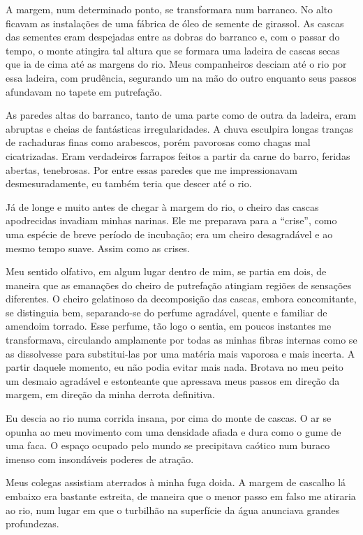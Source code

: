 A margem, num determinado ponto, se transformara num barranco. No alto ficavam as instalações de uma fábrica de óleo de semente de girassol. As cascas das sementes eram despejadas entre as dobras do barranco e, com o passar do tempo, o monte atingira tal altura que se formara uma ladeira de cascas secas que ia de cima até as margens do rio.
Meus companheiros desciam até o rio por essa ladeira, com prudência, segurando um na mão do outro enquanto seus passos afundavam no tapete em putrefação.

As paredes altas do barranco, tanto de uma parte como de outra da ladeira, eram abruptas e cheias de fantásticas irregularidades. A chuva esculpira longas tranças de rachaduras finas como arabescos, porém pavorosas como chagas mal cicatrizadas. Eram verdadeiros farrapos feitos a partir da carne do barro, feridas abertas, tenebrosas.
Por entre essas paredes que me impressionavam desmesuradamente, eu também teria que descer até o rio.

Já de longe e muito antes de chegar à margem do rio, o cheiro das cascas apodrecidas invadiam minhas narinas. Ele me preparava para a ``crise'', como uma espécie de breve período de incubação; era um cheiro desagradável e ao mesmo tempo suave. Assim como as crises.

Meu sentido olfativo, em algum lugar dentro de mim, se partia em dois, de maneira que as emanações do cheiro de putrefação atingiam regiões de sensações diferentes. O cheiro gelatinoso da decomposição das cascas, embora concomitante, se distinguia bem, separando-se do perfume agradável, quente e familiar de amendoim torrado. 
Esse perfume, tão logo o sentia, em poucos instantes me transformava, circulando amplamente por todas as minhas fibras internas como se as dissolvesse para substitui-las por uma matéria mais vaporosa e mais incerta. A partir daquele momento, eu não podia evitar mais nada. Brotava no meu peito um desmaio agradável e estonteante que apressava meus passos em direção da margem, em direção da minha derrota definitiva.

Eu descia ao rio numa corrida insana, por cima do monte de cascas. O ar se opunha ao meu movimento com uma densidade afiada e dura como o gume de uma faca. O espaço ocupado pelo mundo se precipitava caótico num buraco imenso com insondáveis poderes de atração.

Meus colegas assistiam aterrados à minha fuga doida. A margem de cascalho lá embaixo era bastante estreita, de maneira que o menor passo em falso me atiraria ao rio, num lugar em que o turbilhão na superfície da água anunciava grandes profundezas.

